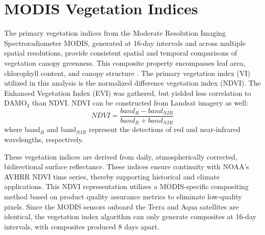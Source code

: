 \section{MODIS Vegetation Indices} \label{tmas:ndvi} The primary vegetation indices from the Moderate Resolution Imaging Spectroradiometer MODIS, generated at 16-day intervals and across multiple spatial resolutions, provide consistent spatial and temporal comparisons of vegetation canopy greenness. This composite property encompasses leaf area, chlorophyll content, and canopy structure \parencite{ramapriyan2022}. The primary vegetation index (VI) utilized in this analysis is the normalized difference vegetation index (NDVI). The Enhanced Vegetation Index (EVI) was gathered, but yielded less correlation to DAMO$_3$ than NDVI. NDVI can be constructed from Landsat imagery as well: \[NDVI = \frac{band_{R}-band_{NIR}}{band_{R}+band_{NIR}}\] where band$_{R}$ and band$_{NIR}$ represent the detections of red and near-infrared wavelengths, respectively.

These vegetation indices are derived from daily, atmospherically corrected, bidirectional surface reflectance. These indices ensure continuity with NOAA's AVHRR NDVI time series, thereby supporting historical and climate applications. This NDVI representation utilizes a MODIS-specific compositing method based on product quality assurance metrics to eliminate low-quality pixels. Since the MODIS sensors onboard the Terra and Aqua satellites are identical, the vegetation index algorithm can only generate composites at 16-day intervals, with composites produced 8 days apart. 
